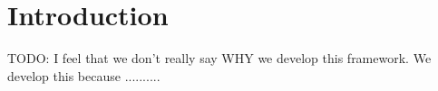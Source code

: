 \documentclass[twoside,a4paper]{article}
\title{\papertitle}
\begin{document}

\maketitle





\begin{abstract}

Jamoma Multicore is a framework for creating graph structures in which unit generators are connected together to process multichannel audio in real-time.  
The main applications currently are processing of multichannel audio signals in Max/MSP and PureData as well as live audio coding in Ruby.  
Jamoma Multicore forms part of the Jamoma layered architecture.



\end{abstract}




\section{Introduction} %
\label{sec:intro}
TODO: I feel that we don't really say WHY we develop this framework. We develop this because .......... 
\end{document}
